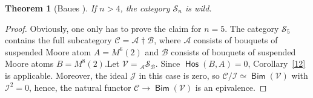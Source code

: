 \documentclass[12pt,a4paper]{amsart}
\newtheorem{theorem}{Theorem}[section]
\theoremstyle{definition}
\theoremstyle{remark}
\numberwithin{equation}{section}
\begin{document}
\begin{theorem}[Baues \cite{bd3}]\label{wild-1}
  If $n>4$, the category ${\mathscr S}_n$ is wild.
\end{theorem}
\begin{proof}
  Obviously, one only has to prove the claim for $n=5$.
  The category ${\mathscr S}_5$ contains the full subcategory ${\mathscr C}={\mathscr A}\dag{\mathscr B}$,
  where ${\mathscr A}$ consists of bouquets of suspended Moore atom $A=M^6(2)$
  and ${\mathscr B}$ consists of bouquets of suspended Moore atoms
  $B=M^8(2)$.Let ${\mathscr V}={}_{\mathscr A}{\mathscr S}_{\mathscr B}$. Since ${\mathop\mathsf{Hos}\nolimits}(B,A)=0$,
  Corollary~\ref{12} is applicable. Moreover, the ideal ${\mathscr J}$ in this
  case is zero, so ${\mathscr C}/{\mathscr I}\simeq{\mathop\mathsf{Bim}\nolimits}({\mathscr V})$ with ${\mathscr I}^2=0$, hence, the
  natural functor ${\mathscr C}\to{\mathop\mathsf{Bim}\nolimits}({\mathscr V})$ is an epivalence.


\end{proof}
\end{document}
